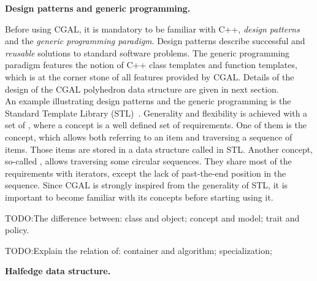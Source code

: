 
\noindent \textbf{Design patterns and generic programming.}

Before using CGAL, it is mandatory to be familiar with C++,
\emph{design patterns} and the \emph{generic programming paradigm}. 
Design patterns \cite{Gamma:1995:DP} describe successful and
\emph{reusable} solutions to standard software problems.  The generic
programming paradigm \cite{Alexandrescu:2001:MCD} features the notion
of C++ class templates and function templates, which is at the corner
stone of all features provided by CGAL. Details of the design of the
CGAL polyhedron data structure are given in next section.\\

An example illustrating design patterns and the generic programming is
the Standard Template Library (STL)~\cite{ms-stl-96}. Generality and
flexibility is achieved with a set of , where a
concept is a well defined set of requirements. One of them is the
 concept, which allows both referring to an item and
traversing a sequence of items. Those items are stored in a data
structure called  in STL. Another concept, so-called
, allows traversing some circular sequences. They
share most of the requirements with iterators, except the lack of
past-the-end position in the sequence. Since CGAL is strongly inspired
from the generality of STL, it is important to become familiar with
its concepts before starting using it.


TODO:The difference between: class and object; concept and model;
trait and policy.

TODO:Explain the relation of: container and algorithm; specialization;

\noindent \textbf{Halfedge data structure.}

